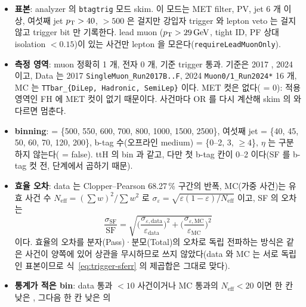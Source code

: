 \begin{itemize}
\item \textbf{표본}: analyzer 의 \texttt{btagtrig} 모드 skim. 이 모드는 MET filter, PV, jet 6 개 이상, 여섯째 jet $p_{\mathrm{T}}>40$, \HT{} $>500$ 은
  걸지만 강입자 trigger 와 lepton veto 는 걸지 않고 trigger bit 만 기록한다. lead muon
  ($p_{\mathrm{T}}>29\,\mathrm{GeV}$, tight ID, PF 상대 isolation $<0.15$)이 있는 사건만 lepton 을 모은다(\texttt{requireLeadMuonOnly})\tagimpl.
\item \textbf{측정 영역}: muon 정확히 1 개, 전자 0 개, 기준 trigger 통과. 기준은 2017 , 2024 
  이고, Data 는 2017 \texttt{SingleMuon\_Run2017B..F}, 2024 \texttt{Muon0/1\_Run2024*} 16 개, MC 는 \texttt{TTbar\_\{DiLep, Hadronic, SemiLep\}}
  이다. MET 컷은 없다( = 0): 적용 영역인 FH 에 MET 컷이 없기
  때문이다\tagours. 사건마다 OR 를 다시 계산해 skim 의  와 다르면 멈춘다.
\item \textbf{binning}: \HT{} = \{500, 550, 600, 700, 800, 1000, 1500, 2500\}\GeV, 여섯째 jet \pt{} = \{40, 45, 50, 60, 70, 120, 200\}\GeV,
  b-tag 수(오프라인 medium) = \{0--2, 3, $\geq 4$\}, $\eta$ 는 구분하지 않는다( = false). ttH 의 bin 과 같고, 다만 첫 b-tag 칸이
  0--2 이다(SF 를 b-tag 컷 전, \HT{} 단계에서 곱하기 때문)\tagimpl.
\item \textbf{효율 오차}: data 는 Clopper--Pearson 68.27\,\% 구간의 반폭, MC(가중 사건)는 유효 사건 수 $N_\text{eff} = (\sum w)^2/\sum w^2$ 로
  $\sigma_\varepsilon = \sqrt{\varepsilon(1-\varepsilon)/N_\text{eff}}$ 이고, SF 의 오차는
  \begin{equation}
    \frac{\sigma_\mathrm{SF}}{\mathrm{SF}} = \sqrt{\Big(\frac{\sigma_{\varepsilon,\text{data}}}{\varepsilon_\text{data}}\Big)^2
    + \Big(\frac{\sigma_{\varepsilon,\text{MC}}}{\varepsilon_\text{MC}}\Big)^2}
    \label{eq:trigger-sferr}
  \end{equation}
  이다. 효율의 오차를 분자(Pass)·분모(Total)의 오차로 독립 전파하는 방식은 같은 사건이
  양쪽에 있어 상관을 무시하므로 쓰지 않았다(data 와 MC 는 서로 독립인 표본이므로 식~\eqref{eq:trigger-sferr} 의 제곱합은 그대로 맞다).
\item \textbf{통계가 적은 bin}: data 통과 $<10$ 사건이거나 MC 통과의 $N_\text{eff}<20$ 이면 한 칸 낮은 \pt{}, 그다음 한 칸 낮은 \HT{} 의

\end{itemize}
